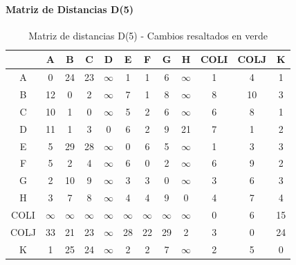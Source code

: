 \documentclass[12pt]{article}
\begin{document}
\paragraph{Matriz de Distancias D(5)}
\begin{table}[h!]
\centering
\begin{tabular}{|c|c|c|c|c|c|c|c|c|c|c|c|}
\hline
 & A & B & C & D & E & F & G & H & COLI & COLJ & K \\\hline
A & 0 & 24 & 23 & $\infty$ & 1 & 1 & \cellcolor{lightgreen} 6 & $\infty$ & 1 & \cellcolor{lightgreen} 4 & 1 \\\hline
B & 12 & 0 & 2 & $\infty$ & 7 & 1 & 8 & $\infty$ & \cellcolor{lightgreen} 8 & \cellcolor{lightgreen} 10 & 3 \\\hline
C & \cellcolor{lightgreen} 10 & 1 & 0 & $\infty$ & 5 & 2 & 6 & $\infty$ & \cellcolor{lightgreen} 6 & \cellcolor{lightgreen} 8 & 1 \\\hline
D & \cellcolor{lightgreen} 11 & 1 & 3 & 0 & 6 & 2 & 9 & 21 & \cellcolor{lightgreen} 7 & 1 & 2 \\\hline
E & 5 & 29 & 28 & $\infty$ & 0 & 6 & 5 & $\infty$ & 1 & 3 & 3 \\\hline
F & 5 & 2 & 4 & $\infty$ & 6 & 0 & 2 & $\infty$ & 6 & \cellcolor{lightgreen} 9 & 2 \\\hline
G & 2 & 10 & 9 & $\infty$ & 3 & 3 & 0 & $\infty$ & 3 & \cellcolor{lightgreen} 6 & 3 \\\hline
H & 3 & 7 & 8 & $\infty$ & 4 & 4 & \cellcolor{lightgreen} 9 & 0 & 4 & 7 & 4 \\\hline
COLI & $\infty$ & $\infty$ & $\infty$ & $\infty$ & $\infty$ & $\infty$ & $\infty$ & $\infty$ & 0 & 6 & 15 \\\hline
COLJ & 33 & 21 & 23 & $\infty$ & 28 & 22 & 29 & 2 & 3 & 0 & 24 \\\hline
K & 1 & 25 & 24 & $\infty$ & 2 & 2 & \cellcolor{lightgreen} 7 & $\infty$ & 2 & 5 & 0 \\\hline
\end{tabular}
\caption{Matriz de distancias D(5) - Cambios resaltados en verde}
\end{table}
\end{document}
